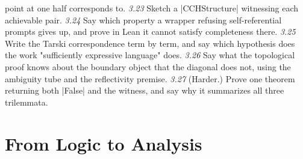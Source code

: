 \documentclass{memoir}
\begin{document}
point at one half corresponds to.
\emph{3.23} Sketch a \LeanVerb|CCHStructure| witnessing each achievable pair.
\emph{3.24} Say which property a wrapper refusing self-referential prompts gives up, and
prove in Lean it cannot satisfy completeness there.
\emph{3.25} Write the Tarski correspondence term by term, and say which hypothesis does the
work "sufficiently expressive language" does.
\emph{3.26} Say what the topological proof knows about the boundary object that the
diagonal does not, using the ambiguity tube and the reflectivity premise.
\emph{3.27} (Harder.) Prove one theorem returning both \LeanVerb|False| and the witness, and say why
it summarizes all three trilemmata.



\section{From Logic to Analysis}\label{Two--Schemas--of--Impossibility-005F-005F-005F--Machine--Checked--Limits--of--Trustworthy--Machine--Learning-005F-005F-005F--and--Why--They--Tighten--with--Capability----Exercises----From--Logic--to--Analysis}
\end{document}
